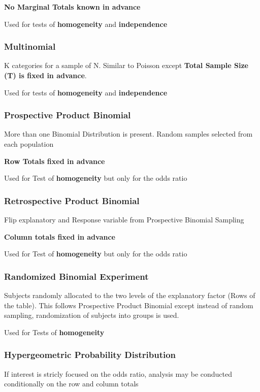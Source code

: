 \documentclass[11pt]{article}
\begin{document}
\textbf{No Marginal Totals known in advance}

Used for tests of \textbf{homogeneity} and \textbf{independence}

\subsubsection{Multinomial}
\label{sec:org55b8c5a}
K categories for a sample of N. Similar to Poisson except \textbf{Total Sample
Size (T) is fixed in advance}.

Used for tests of \textbf{homogeneity} and \textbf{independence}

\subsubsection{Prospective Product Binomial}
\label{sec:orgefa5e9f}
More than one Binomial Distribution is present. Random samples selected
from each population

\textbf{Row Totals fixed in advance}

Used for Test of \textbf{homogeneity} but only for the odds ratio

\subsubsection{Retrospective Product Binomial}
\label{sec:orga62de6e}
Flip explanatory and Response variable from Prospective Binomial
Sampling

\textbf{Column totals fixed in advance}

Used for Test of \textbf{homogeneity} but only for the odds ratio

\subsubsection{Randomized Binomial Experiment}
\label{sec:orgea5627b}
Subjects randomly allocated to the two levels of the explanatory factor
(Rows of the table). This follows Prospective Product Binomial except
instead of random sampling, randomization of subjects into groups is
used.

Used for Tests of \textbf{homogeneity}

\subsubsection{Hypergeometric Probability Distribution}
\label{sec:orge387851}
If interest is stricly focused on the odds ratio, analysis may be
conducted conditionally on the row and column totals
\end{document}

